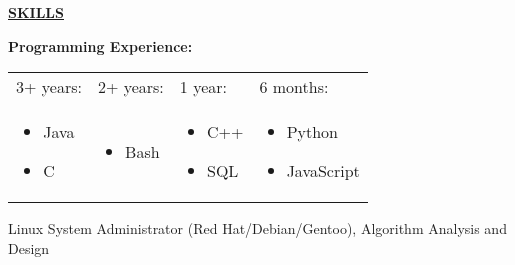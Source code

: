 \documentclass[letter,11pt]{article}
\begin{document}
\begin{center}
  \vspace{-\topsep}
  \underline{\textbf{SKILLS}}
\end{center}

\noindent
\vspace{-\topsep}
\textbf{Programming Experience:}
\begin{center}
  \begin{tabular}{@{}p{}p{}p{}p{}@{}}
  3+ years: & 2+ years: & 1 year: & 6 months: \\
  \vspace{-\topsep} \begin{itemize}[noitemsep,topsep=0pt,leftmargin=6mm]
  \item Java
  \item C
  \end{itemize}
  &
  \vspace{-\topsep} \begin{itemize}[noitemsep,topsep=0pt, leftmargin=6mm]
  \item Bash
  \end{itemize}
  &
  \vspace{-\topsep} \begin{itemize}[noitemsep,topsep=0pt, leftmargin=6mm]
  \item C++
  \item SQL
    
  \end{itemize}
  &
  \vspace{-\topsep} \begin{itemize}[noitemsep,topsep=0pt, leftmargin=6mm]
  \item Python
  \item JavaScript
  \end{itemize}
\end{tabular}
\end{center}
\begin{center}
  Linux System Administrator (Red Hat/Debian/Gentoo), Algorithm Analysis and Design
\end{center}
\end{document}
